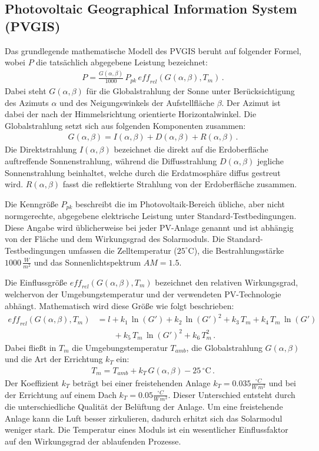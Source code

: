 \documentclass[a4paper,11pt]{article}
\begin{document}
\subsection{Photovoltaic Geographical Information System (PVGIS)}
Das grundlegende mathematische Modell des PVGIS beruht auf folgender Formel,
wobei $P$ die tatsächlich abgegebene Leistung bezeichnet:
\begin{gather*}
  P=\frac{G(\alpha,\beta)}{1000}\, P_{pk}\,
  \mathit{eff}_{rel}(G(\alpha,\beta),T_m)\,.
\end{gather*}
Dabei steht $G(\alpha,\beta)$ für die Globalstrahlung der Sonne unter
Berücksichtigung des Azimuts $\alpha$ und des Neigungswinkels der
Aufstellfläche $\beta$. Der Azimut ist dabei der nach der Himmelsrichtung
orientierte Horizontalwinkel. Die Globalstrahlung setzt sich aus folgenden
Komponenten zusammen:
\begin{gather*}
  G(\alpha,\beta)=I(\alpha,\beta)+D(\alpha,\beta)+R(\alpha,\beta)\,.
\end{gather*}
Die Direktstrahlung $I(\alpha,\beta)$ bezeichnet die direkt auf die
Erdoberfläche auftreffende Sonnenstrahlung, während die Diffusstrahlung
$D(\alpha,\beta)$ jegliche Sonnenstrahlung beinhaltet, welche durch die
Erdatmosphäre diffus gestreut wird. $R(\alpha,\beta)$ fasst die reflektierte
Strahlung von der Erdoberfläche zusammen.

Die Kenngröße $P_{pk}$ beschreibt die im Photovoltaik-Bereich übliche, aber
nicht normgerechte, abgegebene elektrische Leistung unter
Standard-Testbedingungen.  Diese Angabe wird üblicherweise bei jeder PV-Anlage
genannt und ist abhängig von der Fläche und dem Wirkungsgrad des Solarmoduls.
Die Standard-Testbedingungen umfassen die Zelltemperatur
($25^\circ\mathrm{C}$), die Bestrahlungsstärke $1000\,\frac{W}{m^2}$ und das
Sonnenlichtspektrum $AM=1.5$.

Die Einflussgröße $\mathit{eff}_{rel}(G(\alpha,\beta),T_m)$ bezeichnet den
relativen Wirkungsgrad, welchervon der Umgebungstemperatur und der verwendeten
PV-Technologie abhängt. Mathematisch wird diese Größe wie folgt beschrieben:
\begin{align*}
  \mathit{eff}_{rel}(G(\alpha,\beta),T_m) &= l +k_1\,\ln(G') +k_2\,\ln(G')^2+
  k_3\,T_m +k_4\,T_m\,\ln(G')\\ &\qquad +k_5\,T_m\,\ln(G')^2 +k_6\, T_m^2\,.
\end{align*}
Dabei fließt in $T_m$ die Umgebungstemperatur $T_{amb}$, die Globalstrahlung
$G(\alpha,\beta)$ und die Art der Errichtung $k_T$ ein:
\begin{gather*}
  T_m= T_{amb}+k_T\,G(\alpha,\beta)-25\,\mathrm{{^\circ}C}\,.
\end{gather*}
Der Koeffizient $k_T$ beträgt bei einer freistehenden Anlage
$k_T=0.035\frac{{^\circ}C}{W\,m^2}$ und bei der Errichtung auf einem Dach
$k_T=0.05\frac{{^\circ}C}{W\,m^2}$.  Dieser Unterschied entsteht durch die
unterschiedliche Qualität der Belüftung der Anlage. Um eine freistehende
Anlage kann die Luft besser zirkulieren, dadurch erhitzt sich das Solarmodul
weniger stark. Die Temperatur eines Moduls ist ein wesentlicher Einflussfaktor
auf den Wirkungsgrad der ablaufenden Prozesse.
\end{document}
